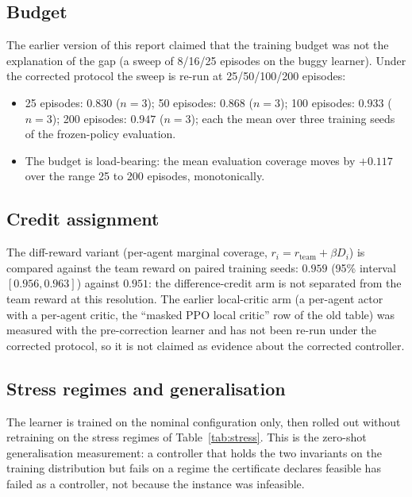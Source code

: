 \documentclass[conference]{IEEEtran}
\begin{document}
\subsection{Budget}
\label{sec:results_budget}

The earlier version of this report claimed that the training budget was not
the explanation of the gap (a sweep of 8/16/25 episodes on the buggy learner).
Under the corrected protocol the sweep is re-run at 25/50/100/200 episodes:

\begin{itemize}
  \item 25 episodes: $0.830$ ($n=3$); 50 episodes: $0.868$ ($n=3$);
        100 episodes: $0.933$ ($n=3$); 200 episodes: $0.947$ ($n=3$);
        each the mean over three training seeds of the frozen-policy evaluation.
  \item The budget is load-bearing: the mean evaluation coverage moves by
        $+0.117$ over the range 25 to 200 episodes, monotonically.
\end{itemize}

\subsection{Credit assignment}
\label{sec:results_credit}

The diff-reward variant (per-agent marginal coverage, $r_i = r_{\text{team}}
+ \beta D_i$) is compared against the team reward on paired training seeds:
$0.959$ (95\% interval $[0.956, 0.963]$) against $0.951$: the difference-credit arm is not separated from the team reward at this resolution.  The
earlier local-critic arm (a per-agent actor with a per-agent critic, the
``masked PPO local critic'' row of the old table) was measured with the
pre-correction learner and has not been re-run under the corrected protocol,
so it is not claimed as evidence about the corrected controller.
\subsection{Stress regimes and generalisation}
\label{sec:results_stress}

The learner is trained on the nominal configuration only, then rolled out
without retraining on the stress regimes of Table~\ref{tab:stress}.  This is
the zero-shot generalisation measurement: a controller that holds the two
invariants on the training distribution but fails on a regime the certificate
declares feasible has failed as a controller, not because the instance was
infeasible.
\end{document}
